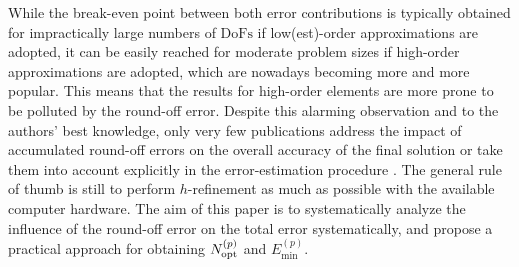 \documentclass[final,3p]{elsarticle}
\begin{document}
While the break-even point between both error contributions is typically obtained for impractically large numbers of $\text{DoFs}$ if low(est)-order approximations are adopted, it can be easily reached for moderate problem sizes if high-order approximations are adopted, which are nowadays becoming more and more popular. This means that the results for high-order elements are more prone to be polluted by the round-off error.
Despite this alarming observation and to the authors’ best knowledge, only very few publications address the impact of accumulated round-off errors on the overall accuracy of the final solution \citep{ling1984numerical,mou2017example} or take them into account explicitly in the error-estimation procedure {\citep{ainsworth1992procedure,kelly1983posteriori}}.
The general rule of thumb is still to perform $h$-refinement as much as possible with the available computer hardware.
The aim of this paper is to systematically analyze the influence of the round-off error on the total error systematically, and propose a practical approach for obtaining $N_{\rm opt}^{(p)}$ and ${E}_{\text{min}}^{(p)}$.






\end{document}
